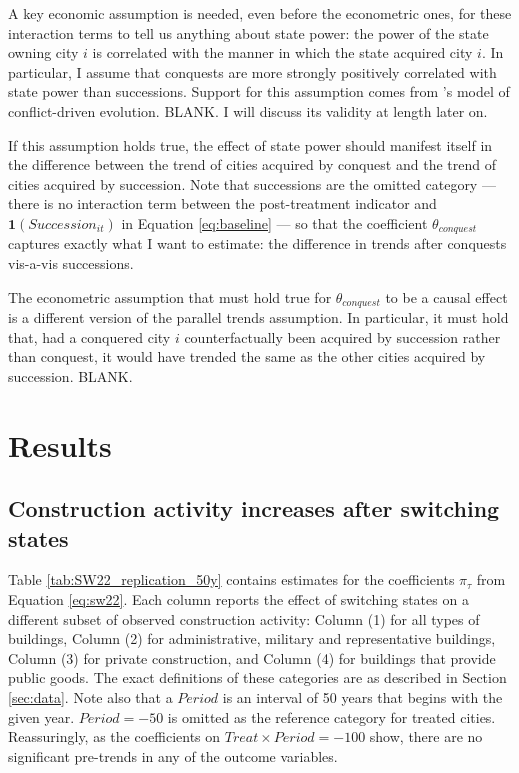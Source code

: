 \documentclass[11pt, a4paper]{article}
\begin{document}
A key economic assumption is needed, even before the econometric ones, for these interaction terms to tell us anything about state power: the power of the state owning city $i$ is correlated with the manner in which the state acquired city $i$. In particular, I assume that conquests are more strongly positively correlated with state power than successions. Support for this assumption comes from \cite{levine2021}'s model of conflict-driven evolution. BLANK. I will discuss its validity at length later on.

If this assumption holds true, the effect of state power should manifest itself in the difference between the trend of cities acquired by conquest and the trend of cities acquired by succession. Note that successions are the omitted category --- there is no interaction term between the post-treatment indicator and $\mathbf{1}(Succession_{it})$ in Equation \eqref{eq:baseline} --- so that the coefficient $\theta_{conquest}$ captures exactly what I want to estimate: the difference in trends after conquests vis-a-vis successions.

The econometric assumption that must hold true for $\theta_{conquest}$ to be a causal effect is a different version of the parallel trends assumption. In particular, it must hold that, had a conquered city $i$ counterfactually been acquired by succession rather than conquest, it would have trended the same as the other cities acquired by succession. BLANK.



\section{Results} \label{sec:results}

\subsection{Construction activity increases after switching states}

Table \ref{tab:SW22_replication_50y} contains estimates for the coefficients $\pi_\tau$ from Equation \eqref{eq:sw22}. Each column reports the effect of switching states on a different subset of observed construction activity: Column (1) for all types of buildings, Column (2) for administrative, military and representative buildings, Column (3) for private construction, and Column (4) for buildings that provide public goods. The exact definitions of these categories are as described in Section \ref{sec:data}. Note also that a $Period$ is an interval of 50 years that begins with the given year. $Period = -50$ is omitted as the reference category for treated cities. Reassuringly, as the coefficients on $Treat \times Period = -100$ show, there are no significant pre-trends in any of the outcome variables. 
\end{document}
